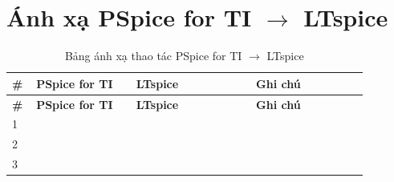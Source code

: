 \section{Ánh xạ PSpice for TI $\rightarrow$ LTspice}
\renewcommand{\arraystretch}{1.3}
\begin{longtable}{>{\raggedright}p{0.05\linewidth} >{\raggedright}p{0.25\linewidth} >{\raggedright}p{0.3\linewidth} p{0.28\linewidth}}
\caption{Bảng ánh xạ thao tác PSpice for TI $\rightarrow$ LTspice}\\
\toprule
\textbf{\#} & \textbf{PSpice for TI} & \textbf{LTspice} & \textbf{Ghi chú} \\ \midrule
\endfirsthead
\toprule
\textbf{\#} & \textbf{PSpice for TI} & \textbf{LTspice} & \textbf{Ghi chú} \\ \midrule
\endhead
1 & \todo{} & & \\
2 & & & \\
3 & & & \\
\bottomrule
\end{longtable}
